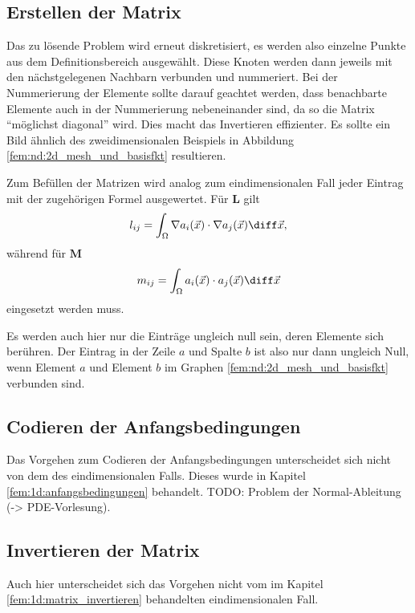 \subsection{Erstellen der Matrix}
Das zu lösende Problem wird erneut diskretisiert, es werden also einzelne Punkte aus dem Definitionsbereich ausgewählt.
Diese Knoten werden dann jeweils mit den nächstgelegenen Nachbarn verbunden und nummeriert.
Bei der Nummerierung der Elemente sollte darauf geachtet werden, dass benachbarte Elemente auch in der Nummerierung nebeneinander sind, da so die Matrix ``möglichst diagonal'' wird.
Dies macht das Invertieren effizienter.
Es sollte ein Bild ähnlich des zweidimensionalen Beispiels in Abbildung \ref{fem:nd:2d_mesh_und_basisfkt}
resultieren.

Zum Befüllen der Matrizen wird analog zum eindimensionalen Fall jeder Eintrag mit der zugehörigen Formel ausgewertet.
Für $\mathbf{L}$ gilt
\begin{equation}
    l_{ij} = \int_{\Omega} \nabla a_i(\vec{x}) \cdot \nabla a_j(\vec{x}) \diff \vec{x},
\end{equation}
während für $\mathbf{M}$ 
\begin{equation}
    m_{ij} = \int_{\Omega} a_i(\vec{x}) \cdot a_j(\vec{x}) \diff \vec{x}
\end{equation}
eingesetzt werden muss.

Es werden auch hier nur die Einträge ungleich null sein, deren Elemente sich berühren.
Der Eintrag in der Zeile $a$ und Spalte $b$ ist also nur dann ungleich Null, wenn Element $a$ und Element $b$ im Graphen \ref{fem:nd:2d_mesh_und_basisfkt} verbunden sind.

\subsection{Codieren der Anfangsbedingungen}
Das Vorgehen zum Codieren der Anfangsbedingungen unterscheidet sich nicht von dem des eindimensionalen Falls. 
Dieses wurde in Kapitel \ref{fem:1d:anfangsbedingungen} behandelt.
TODO: Problem der Normal-Ableitung (-> PDE-Vorlesung).

\subsection{Invertieren der Matrix}
Auch hier unterscheidet sich das Vorgehen nicht vom im Kapitel \ref{fem:1d:matrix_invertieren} behandelten eindimensionalen Fall.